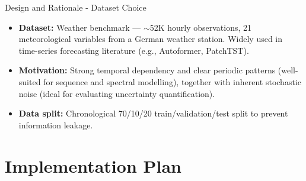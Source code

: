 \documentclass[10pt]{beamer}
\begin{document}
\begin{frame}[fragile]{Design and Rationale - Dataset Choice} 

\begin{itemize}

\item \textbf{Dataset:} Weather benchmark — $\sim$52K hourly observations, 21 meteorological variables from a German weather station. Widely used in time-series forecasting literature (e.g., Autoformer, PatchTST).

\vspace{0.5em}

\item \textbf{Motivation:} Strong temporal dependency and clear periodic patterns (well-suited for sequence and spectral modelling), together with inherent stochastic noise (ideal for evaluating uncertainty quantification).

\vspace{0.5em}

\item \textbf{Data split:} Chronological 70/10/20 train/validation/test split to prevent information leakage.

\end{itemize}

\end{frame}



\section{Implementation Plan}
\end{document}
